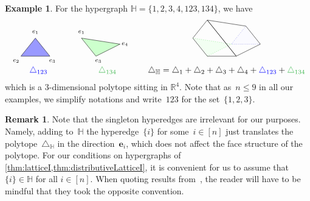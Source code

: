 \documentclass{amsart}
\theoremstyle{definition}
\newtheorem{example}[theorem]{Example}
\newtheorem{remark}[theorem]{Remark}
\newcommand{\R}{\mathbb{R}} %
\renewcommand{\b}[1]{\boldsymbol{#1}} %
\newcommand{\simplex}{\triangle} %
\newcommand{\blue}[1]{{\color{blue} #1}} %
\newcommand{\green}[1]{{\color{darkgreen} #1}} %
\newcommand{\HH}{\mathbb H}  %
\begin{document}
\begin{example}
\label{exm:DH1}
For the hypergraph $\HH=\{ 1, 2, 3, 4, 123, 134 \}$,
we  have
\[
\begin{array}{ccc}
 \begin{tikzpicture}[scale=1,baseline=.5cm]
	\node (1) at (0.6,1.0) {$\scriptstyle e_1$};
	\node (2) at (-.2,-.2) {$\scriptstyle e_2$};
	\node (3) at (1.3,-.2) {$\scriptstyle e_3$};
	\draw [fill=blue!40] (0,0) -- (.6,.75) -- (1.2,0) --(0,0) ;   %
\end{tikzpicture} \quad &
 \begin{tikzpicture}[scale=1,baseline=.5cm]
	\node (1) at (0.6,1.0) {$\scriptstyle e_1$};
	\node at (1.3,-.2) {$\scriptstyle e_3$};
	\node at (2.4,.5) {$\scriptstyle e_4$};
	\draw [fill=green!20] (1.2,0) -- (2.2,.5 )--(.6,.75)--(1.2,0); %
\end{tikzpicture} \quad &
\begin{tikzpicture}[scale=1,baseline=.5cm]
	\draw [color=gray!10,fill=blue!2] (1.6,1.25)--(1,.5)--(2.2,.5)-- (1.6,1.25); 
	\draw [color=gray!10,fill=green!5]  (0,0)--(1,.5)--(-.6,.75)--(0,0);
	\draw [dotted,color=green] (0,0)--(1,.5)--(-.6,.75);
	\draw [dotted,color=blue] (1.6,1.25)--(1,.5)--(2.2,.5);
	\draw (0,1.5)-- (1.6,1.25) -- (2.2,.5) -- (1.2,0) --(0,1.5) ; 
	\draw (0,0)--(-.6,.75)--(0,1.5)-- (1.2,0) --(0,0); 
\end{tikzpicture}\\
\blue{\simplex_{123}}& \green{\simplex_{134}} & \simplex_\HH = \simplex_1 + \simplex_2 + \simplex_3 + \simplex_4 + \blue{\simplex_{123}} + \green{\simplex_{134}}\\
\end{array}
\]
which is a 3-dimensional polytope sitting in $\R^4$.
Note that as~$n \le 9$ in all our examples, we simplify notations and write~$123$ for the set~$\{1,2,3\}$.
\end{example}

\begin{remark}
\label{rem:single}
\enlargethispage{.2cm}
Note that the singleton hyperedges are irrelevant for our purposes.
Namely, adding to~$\HH$ the hyperedge~$\{i\}$ for some~$i \in [n]$ just translates the polytope~$\simplex_\HH$ in the direction~$\b{e}_i$, which does not affect the face structure of the polytope.
For our conditions on hypergraphs of \cref{thm:latticeI,thm:distributiveLatticeI}, it is convenient for us to assume that $\{i\} \in \HH$ for all $i \in [n]$.
When quoting results from~\cite{BenedettiBergeronMachacek}, the reader will have to be mindful that they took the opposite convention.
\end{remark}
\end{document}
